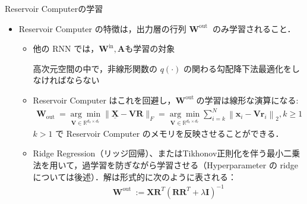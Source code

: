 \begin{frame}{Reservoir Computerの学習}
    \begin{itemize}
        \item Reservoir Computer の特徴は，出力層の行列 $\mathbf{W}^{\text {out }}$ のみ学習されること．\begin{itemize}
            \item 他の RNN では，$\mathbf{W}^{\text {in}}, \mathbf{A}$も学習の対象 
            
            \rightarrow 高次元空間の中で，非線形関数の $q(\cdot)$ の関わる勾配降下法最適化をしなければならない 
            
            \item Reservoir Computer はこれを回避し，$\mathbf{W}^{\text {out }}$の学習は線形な演算になる: 
            \begin{align}
                \mathbf{W}_{\text {out }}=\underset{\mathbf{V} \in \mathbb{R}^{d_x \times d_r}}{\arg \min }\|\underline{\mathbf{X}}-\mathbf{V R}\|_F=\underset{\mathbf{V} \in \mathbb{R}^{d_x \times d_r}}{\arg \min } \sum_{i=k}^N\left\|\mathbf{x}_i-\mathbf{V r}_i\right\|_2, k \geq 1 
            \end{align}
            $k > 1$ で Reservoir Computer のメモリを反映させることができる．
            \item Ridge Regression（リッジ回帰）、またはTikhonov正則化を伴う最小二乗法を用いて，過学習を防ぎながら学習させる（Hyperparameter の ridge については後述）．解は形式的に次のように表される：
            \begin{align}
                \mathbf{W}^{\text {out }}:=\mathbf{X R}^T\left(\mathbf{R R}^T+\lambda \mathbf{I}\right)^{-1}
            \end{align}
        \end{itemize}
    \end{itemize}
\end{frame}


